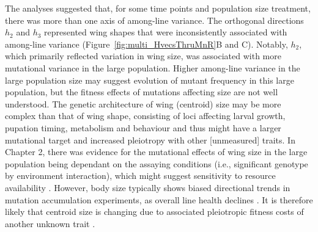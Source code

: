 The analyses suggested that, for some time points and population size treatment, there was more than one axis of among-line variance. The orthogonal directions $h_2$ and $h_3$ represented wing shapes that were inconsistently associated with among-line variance (Figure~\ref{fig:multi_HvecsThruMnR}B and C). Notably, $h_2$, which primarily reflected variation in wing size, was associated with more mutational variance in the large population. Higher among-line variance in the large population size may suggest evolution of mutant frequency in this large population, but the fitness effects of mutations affecting size are not well understood. The genetic architecture of wing (centroid) size may be more complex than that of wing shape, consisting of loci affecting larval growth, pupation timing, metabolism and behaviour \citep[e.g., food acquisition;][]{Roff81, Houl98} and thus might have a larger mutational target and increased pleiotropy with other [unmeasured] traits. In Chapter 2, there was evidence for the mutational effects of wing size in the large population being dependant on the assaying conditions (i.e., significant genotype by environment interaction), which might suggest sensitivity to resource availability \citep{Cavi85, Bitn99}. However, body size typically shows biased directional trends in mutation accumulation experiments, as overall line health declines \citep{Este05}. It is therefore likely that centroid size is changing due to associated pleiotropic fitness costs of another unknown trait \citep{McGu11b}.\par  

